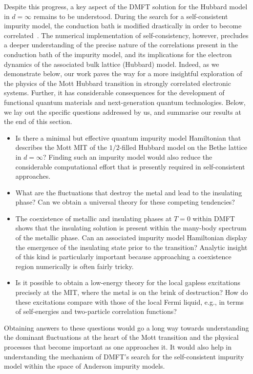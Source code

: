 Despite this progress, a key aspect of the DMFT solution for the Hubbard model in $d=\infty$ remains to be understood. During the search for a self-consistent impurity model, the conduction bath is modified drastically in order to become correlated~\cite{held2008}. The numerical implementation of self-consistency, however, precludes a deeper understanding of the precise nature of the correlations present in the conduction bath of the impurity model, and its implications for the electron dynamics of the associated bulk lattice (Hubbard) model. Indeed, as we demonstrate below, our work paves the way for a more insightful exploration of the physics of the Mott Hubbard transition in strongly correlated electronic systems. Further, it has considerable consequences for the development of functional quantum materials and next-generation quantum technologies. Below, we lay out the specific questions addressed by us, and summarise our results at the end of this section.
\begin{itemize}
	\item[i.] Is there a minimal but effective quantum impurity model Hamiltonian that describes the Mott MIT of the $1/2$-filled Hubbard model on the Bethe lattice in \(d=\infty\)? Finding such an impurity model would also reduce the considerable computational effort that is presently required in self-consistent approaches.
	\item[ii.] What are the fluctuations that destroy the metal and lead to the insulating phase? Can we obtain a universal theory for these competing tendencies?
	\item[iii.] The coexistence of metallic and insulating phases at $T=0$ within DMFT shows that the insulating solution is present within the many-body spectrum of the metallic phase. Can an associated impurity model Hamiltonian display the emergence of the insulating state prior to the transition? Analytic insight of this kind is particularly important because approaching a coexistence region numerically is often fairly tricky.
	\item[iv.] Is it possible to obtain a low-energy theory for the local gapless excitations precisely at the MIT, where the metal is on the brink of destruction? How do these excitations compare with those of the local Fermi liquid, e.g., in terms of self-energies and two-particle correlation functions?
\end{itemize}
Obtaining answers to these questions would go a long way towards understanding the dominant fluctuations at the heart of the Mott transition and the physical processes that become important as one approaches it. It would also help in understanding the mechanism of DMFT's search for the self-consistent impurity model within the space of Anderson impurity models.

